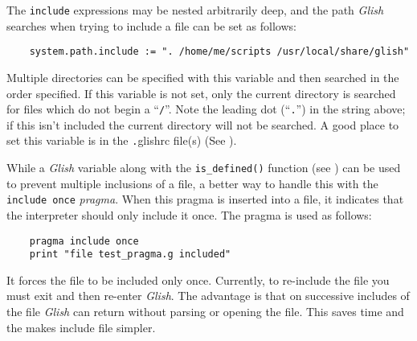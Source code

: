 \label{system-path-include}
The {\tt include} expressions  may be nested arbitrarily deep, 
and the path {\em  Glish} searches
when trying to include a file can be set as follows:
\begin{verbatim}
	system.path.include := ". /home/me/scripts /usr/local/share/glish"
\end{verbatim}
Multiple directories can be specified with this variable and then 
searched in the order specified.
If this variable is not set, only the current directory is
searched for files which do not begin a ``\verb+/+''. Note the leading dot
(``\verb+.+'') in the string above; if this isn't included the current
directory will not be searched.
A good place to set this variable is in the \verb+.+glishrc file(s)
(See ).

While a {\em Glish} variable along with the {\tt is\_defined()} function (see
) can be used to prevent multiple inclusions of a
file, a better way to handle this with the {\tt include once} {\em pragma}.
When  this pragma is inserted into a file, it indicates that the interpreter
should only include it once. The pragma is used as follows:
\begin{verbatim}
    pragma include once
    print "file test_pragma.g included" 
\end{verbatim}
It forces the file to be included only once. Currently, to re-include the
file you must exit and then re-enter {\em Glish}. The advantage is that on successive includes
of the file {\em Glish} can return without parsing or opening the
file.  This saves time and the makes include file simpler.

